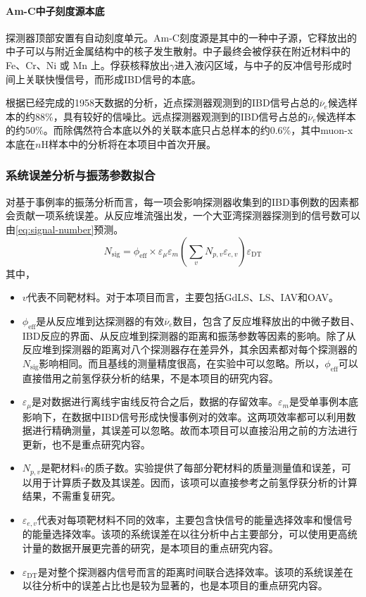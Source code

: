 \documentclass[a4paper,zihao=-4]{article}
\begin{document}
\paragraph{Am-C中子刻度源本底}
探测器顶部安置有自动刻度单元。Am-C刻度源是其中的一种中子源，它释放出的中子可以与附近金属结构中的核子发生散射。中子最终会被俘获在附近材料中的 Fe、Cr、Ni 或 Mn 上。俘获核释放出$\gamma$进入液闪区域，与中子的反冲信号形成时间上关联快慢信号，而形成IBD信号的本底。

根据已经完成的1958天数据的分析，近点探测器观测到的IBD信号占总的$\overline{\nu}_e$候选样本的约88\%，具有较好的信噪比。远点探测器观测到的IBD信号占总的$\overline{\nu}_e$候选样本的约50\%。而除偶然符合本底以外的关联本底只占总样本的约0.6\%，其中muon-x本底在$n$H样本中的分析将在本项目中首次开展。

\subsubsection{系统误差分析与振荡参数拟合}\label{sec:uncertainty}
对基于事例率的振荡分析而言，每一项会影响探测器收集到的IBD事例数的因素都会贡献一项系统误差。从反应堆流强出发，一个大亚湾探测器探测到的信号数可以由\cref{eq:signal-number}预测。
\begin{equation}\label{eq:signal-number}
	N_{\text{sig}} = \phi_{\text{eff}} \times \varepsilon_\mu\varepsilon_m\left(\sum_{v}N_{p,v}\varepsilon_{e,v}\right)\varepsilon_{\text{DT}}
\end{equation}
其中，
\begin{itemize}
	\item $v$代表不同靶材料。对于本项目而言，主要包括GdLS、LS、IAV和OAV。
	\item $\phi_{\text{eff}}$是从反应堆到达探测器的有效$\overline{\nu}_e$数目，包含了反应堆释放出的中微子数目、IBD反应的界面、从反应堆到探测器的距离和振荡参数等因素的影响。除了从反应堆到探测器的距离对八个探测器存在差异外，其余因素都对每个探测器的$N_{\text{sig}}$影响相同。而且基线的测量精度很高，在实验中可以忽略。所以，$\phi_{\text{eff}}$可以直接借用之前氢俘获分析的结果，不是本项目的研究内容。
	\item $\varepsilon_\mu$是对数据进行离线宇宙线反符合之后，数据的存留效率。$\varepsilon_m$是受单事例本底影响下，在数据中IBD信号形成快慢事例对的效率。这两项效率都可以利用数据进行精确测量，其误差可以忽略。故而本项目可以直接沿用之前的方法进行更新，也不是重点研究内容。
	\item $N_{p,v}$是靶材料$v$的质子数。实验提供了每部分靶材料的质量测量值和误差，可以用于计算质子数及其误差。因而，该项可以直接参考之前氢俘获分析的计算结果，不需重复研究。
	\item $\varepsilon_{e,v}$代表对每项靶材料不同的效率，主要包含快信号的能量选择效率和慢信号的能量选择效率。该项的系统误差在以往分析中占主要部分，可以使用更高统计量的数据开展更完善的研究，是本项目的重点研究内容。
	\item $\varepsilon_{\text{DT}}$是对整个探测器内信号而言的距离时间联合选择效率。该项的系统误差在以往分析中的误差占比也是较为显著的，也是本项目的重点研究内容。
\end{itemize}
\end{document}
